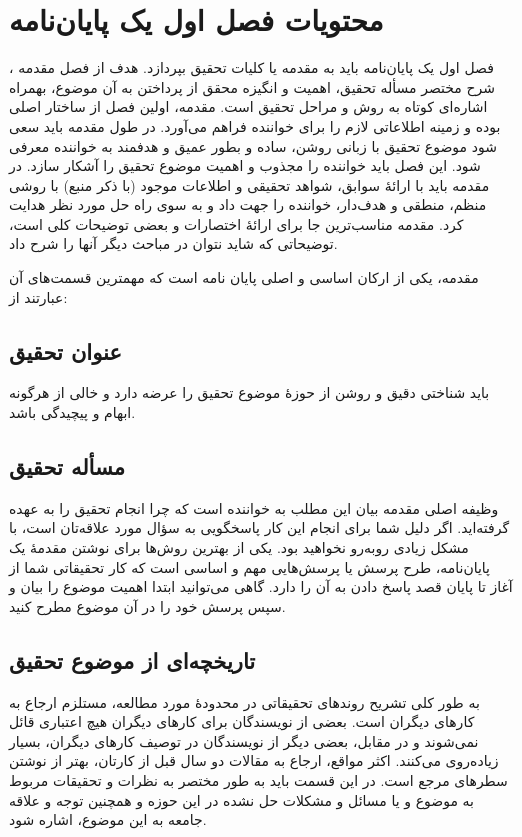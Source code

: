 \section{محتویات فصل اول یک پایان‌نامه}
فصل اول یک پایان‌نامه باید به مقدمه یا کلیات تحقیق بپردازد.
هدف از فصل مقدمه%
،
شرح مختصر مسأله تحقیق، اهمیت و انگیزه محقق از پرداختن به آن موضوع، بهمراه اشاره‌ای کوتاه به روش و مراحل تحقیق است. مقدمه، اولین فصل از ساختار اصلی \پ بوده و زمینه اطلاعاتی لازم را برای خواننده فراهم می‌آورد. در طول مقدمه باید سعی شود موضوع تحقیق با زبانی روشن، ساده و بطور عمیق و هدفمند به خواننده معرفی شود. این فصل باید خواننده را مجذوب و اهمیت موضوع تحقیق را آشکار سازد. در مقدمه باید با ارائهٔ سوابق، شواهد تحقیقی و اطلاعات موجود (با ذکر منبع) با روشی منظم، منطقی و هدف‌دار، خواننده را جهت داد و به سوی راه حل مورد نظر هدایت کرد. مقدمه مناسب‌ترین جا برای ارائهٔ اختصارات و بعضی توضیحات کلی است، توضیحاتی که شاید نتوان در مباحث دیگر آنها را شرح داد.

مقدمه، یکی از ارکان اساسی و اصلی پایان نامه است که مهمترین قسمت‌های آن عبارتند از: 

\subsection{عنوان تحقیق} 
باید شناختی دقیق و روشن از حوزهٔ موضوع تحقیق را عرضه دارد و خالی از هرگونه ابهام و پیچیدگی باشد.

\subsection{مسأله تحقیق}
وظیفه اصلی مقدمه بیان این مطلب به خواننده است که چرا انجام تحقیق را به عهده گرفته‌اید. اگر دلیل شما برای انجام این کار پاسخگویی به سؤال مورد علاقه‌تان است، با مشکل زیادی روبه‌رو نخواهید بود. یکی از بهترین روش‌ها برای نوشتن مقدمهٔ یک پایان‌نامه، طرح پرسش یا پرسش‌هایی مهم و اساسی است که کار تحقیقاتی شما از آغاز تا پایان قصد پاسخ دادن به آن را دارد. گاهی می‌توانید ابتدا اهمیت موضوع را بیان و سپس پرسش خود را در آن موضوع مطرح کنید.

\subsection{تاریخچه‌ای از موضوع تحقیق}
به طور کلی تشریح روندهای تحقیقاتی در محدودهٔ مورد مطالعه، مستلزم ارجاع به کارهای دیگران است. بعضی از نویسندگان برای کارهای دیگران هیچ اعتباری قائل نمی‌شوند و در مقابل، بعضی دیگر از نویسندگان در توصیف کارهای دیگران، بسیار زیاده‌روی می‌کنند. اکثر مواقع، ارجاع به مقالات دو سال قبل از کارتان، بهتر از نوشتن سطرهای مرجع است. در این قسمت باید به طور مختصر به نظرات و تحقیقات مربوط به موضوع و یا مسائل و مشکلات حل نشده در این حوزه و همچنین توجه و علاقه جامعه به این موضوع، اشاره شود.

